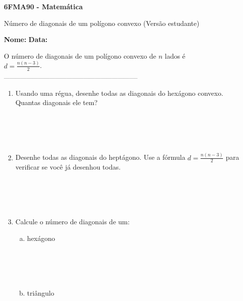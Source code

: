 \documentclass[a4paper,14pt]{article}
\begin{document}
	
	\noindent\textbf{6FMA90 - Matemática} 
	
	\begin{center}Número de diagonais de um polígono convexo (Versão estudante)
	\end{center}
	
	\noindent\textbf{Nome:} \underline{\hspace{10cm}}
	\noindent\textbf{Data:} \underline{\hspace{4cm}}
	
	
	\begin{multicols}{2}
		\noindent O número de diagonais de um polígono convexo de $n$ lados é \\ $d = \frac{n(n - 3)}{2}$. \\
		\noindent\textsubscript{-----------------------------------------------------------------------}
		\begin{enumerate} 
			\item Usando uma régua, desenhe todas as diagonais do hexágono convexo. Quantas diagonais ele tem? \\\\\\\\\\
			\item Desenhe todas as diagonais do heptágono. Use a fórmula $d = \frac{n(n - 3)}{2}$ para verificar se você já desenhou todas. \\\\\\\\\\
			\item Calcule o número de diagonais de um: \\
			\begin{enumerate}[a)]
				\item hexágono \\\\\\\\\\
				\item triângulo \\\\\\\\\\

\end{enumerate}
\end{enumerate}
\end{multicols}
\end{document}
